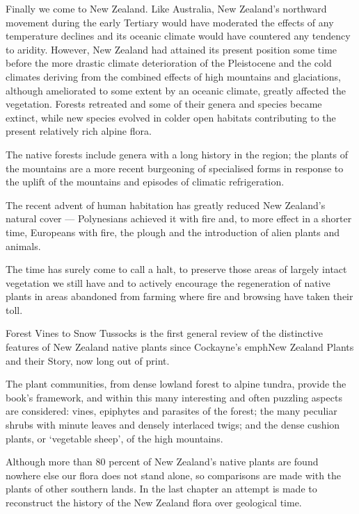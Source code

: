 Finally we come to New Zealand.
Like Australia, New Zealand's northward movement during the early Tertiary would have moderated the effects of any temperature declines and its oceanic climate would have countered any tendency to aridity.
However, New Zealand had attained its present position some time before the more drastic climate deterioration of the Pleistocene and the cold climates deriving from the combined effects of high mountains and glaciations, although ameliorated to some extent by an oceanic climate, greatly affected the vegetation.
Forests retreated and some of their genera and species became extinct, while new species evolved in colder open habitats contributing to the present relatively rich alpine flora.

The native forests include genera with a long history in the region; the plants of the mountains are a more recent burgeoning of specialised forms in response to the uplift of the mountains and episodes of climatic refrigeration.

The recent advent of human habitation has greatly reduced New Zealand's natural cover — Polynesians achieved it with fire and, to more effect in a shorter time, Europeans with fire, the plough and the introduction of alien plants and animals.

The time has surely come to call a halt, to preserve those areas of largely intact vegetation we still have and to actively encourage the regeneration of native plants in areas abandoned from farming where fire and browsing have taken their toll.
\backmatter

Forest Vines to Snow Tussocks is the first general review of the distinctive features of New Zealand native plants since Cockayne's emph{New Zealand Plants and their Story}, now long out of print.

The plant communities, from dense lowland forest to alpine tundra, provide the book's framework, and within this many interesting and often puzzling aspects are considered: vines, epiphytes and parasites of the forest; the many peculiar shrubs with minute leaves and densely interlaced twigs; and the dense cushion plants, or `vegetable sheep', of the high mountains.

Although more than 80 percent of New Zealand's native plants are found nowhere else our flora does not stand alone, so comparisons are made with the plants of other southern lands.
In the last chapter an attempt is made to reconstruct the history of the New Zealand flora over geological time.

